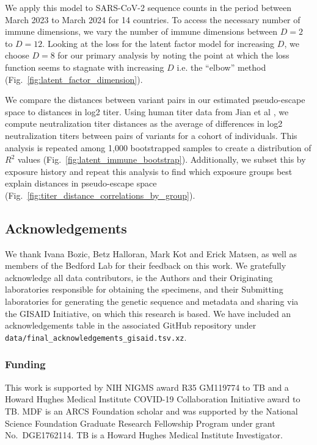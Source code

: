 \documentclass[11pt,oneside,letterpaper]{article}
\begin{document}
We apply this model to SARS-CoV-2 sequence counts in the period between March 2023 to March 2024 for 14 countries.
To access the necessary number of immune dimensions, we vary the number of immune dimensions between $D=2$ to $D=12$.
Looking at the loss for the latent factor model for increasing $D$, we choose $D=8$ for our primary analysis by noting the point at which the loss function seems to stagnate with increasing $D$ i.e. the ``elbow'' method (Fig.~\ref{fig:latent_factor_dimension}).

We compare the distances between variant pairs in our estimated pseudo-escape space to distances in log2 titer.
Using human titer data from Jian et al \cite{Jian2023}, we compute neutralization titer distances as the average of differences in log2 neutralization titers between pairs of variants for a cohort of individuals.
This analysis is repeated among 1,000 bootstrapped samples to create a distribution of $R^2$ values (Fig.~\ref{fig:latent_immune_bootstrap}).
Additionally, we subset this by exposure history and repeat this analysis to find which exposure groups best explain distances in pseudo-escape space (Fig.~\ref{fig:titer_distance_correlations_by_group}).

\subsection*{Acknowledgements}

We thank Ivana Bozic, Betz Halloran, Mark Kot and Erick Matsen, as well as members of the Bedford Lab for their feedback on this work.
We gratefully acknowledge all data contributors, ie the Authors and their Originating
laboratories responsible for obtaining the specimens, and their Submitting laboratories for generating the genetic sequence and metadata and sharing via the GISAID Initiative, on which this research is based.
We have included an acknowledgements table in the associated GitHub repository under \texttt{data/final\_acknowledgements\_gisaid.tsv.xz}.

\subsubsection*{Funding}

This work is supported by NIH NIGMS award R35 GM119774 to TB and a Howard Hughes Medical Institute COVID-19 Collaboration Initiative award to TB.
MDF is an ARCS Foundation scholar and was supported by the National Science Foundation Graduate Research Fellowship Program under grant No.\ DGE1762114.
TB is a Howard Hughes Medical Institute Investigator.
\end{document}
